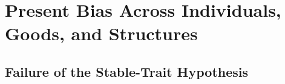 \documentclass[11pt,a4paper]{article}
\theoremstyle{plain}
\theoremstyle{definition}
\begin{document}
\section{Present Bias Across Individuals, Goods, and Structures}
\label{sec:person}


\subsection{Failure of the Stable-Trait Hypothesis}
\end{document}
